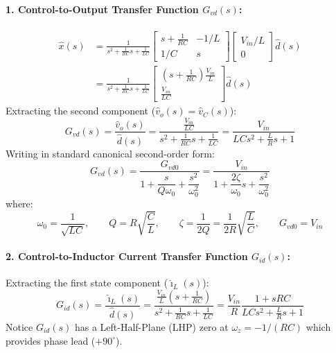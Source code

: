 \paragraph{1. Control-to-Output Transfer Function $G_{vd}(s)$:}
\begin{equation}
\begin{aligned}
\hat{x}(s) &= \frac{1}{s^2 + \frac{1}{RC} s + \frac{1}{LC}} \begin{bmatrix} s + \frac{1}{RC} & -1/L \\ 1/C & s \end{bmatrix} \begin{bmatrix} V_{in}/L \\ 0 \end{bmatrix} \hat{d}(s) \\
&= \frac{1}{s^2 + \frac{1}{RC} s + \frac{1}{LC}} \begin{bmatrix} \left(s + \frac{1}{RC}\right)\frac{V_{in}}{L} \\ \frac{V_{in}}{LC} \end{bmatrix} \hat{d}(s)
\end{aligned}
\end{equation}
Extracting the second component ($\hat{v}_o(s) = \hat{v}_C(s)$):
\begin{equation}
G_{vd}(s) = \frac{\hat{v}_o(s)}{\hat{d}(s)} = \frac{\frac{V_{in}}{LC}}{s^2 + \frac{1}{RC} s + \frac{1}{LC}} = \frac{V_{in}}{L C s^2 + \frac{L}{R} s + 1}
\end{equation}
Writing in standard canonical second-order form:
\begin{equation}
\boxed{G_{vd}(s) = \frac{G_{vd0}}{1 + \dfrac{s}{Q \omega_0} + \dfrac{s^2}{\omega_0^2}} = \frac{V_{in}}{1 + \dfrac{2\zeta}{\omega_0} s + \dfrac{s^2}{\omega_0^2}}}
\end{equation}
where:
\begin{equation}
\boxed{\omega_0 = \frac{1}{\sqrt{LC}}, \qquad Q = R\sqrt{\frac{C}{L}}, \qquad \zeta = \frac{1}{2Q} = \frac{1}{2R}\sqrt{\frac{L}{C}}, \qquad G_{vd0} = V_{in}}
\end{equation}

\paragraph{2. Control-to-Inductor Current Transfer Function $G_{id}(s)$:}
Extracting the first state component ($\hat{\imath}_L(s)$):
\begin{equation}
\boxed{G_{id}(s) = \frac{\hat{\imath}_L(s)}{\hat{d}(s)} = \frac{\frac{V_{in}}{L}\left(s + \frac{1}{RC}\right)}{s^2 + \frac{1}{RC}s + \frac{1}{LC}} = \frac{V_{in}}{R} \frac{1 + sRC}{LC s^2 + \frac{L}{R} s + 1}}
\end{equation}
Notice $G_{id}(s)$ has a Left-Half-Plane (LHP) zero at $\omega_z = -1/(RC)$ which provides phase lead ($+90^\circ$).

